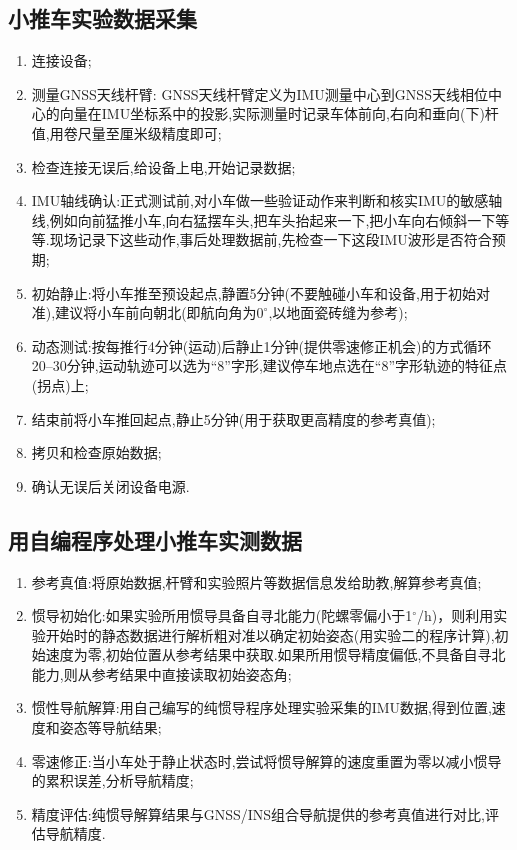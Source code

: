 \documentclass[10pt,a4paper]{ctexart}
\begin{document}
\subsection{小推车实验数据采集}\label{subsec:3.2}
\begin{enumerate}[nosep,label={(\arabic*)}]
\item 连接设备;
\item 测量GNSS天线杆臂: GNSS天线杆臂定义为IMU测量中心到GNSS天线相位中心的向量在IMU坐标系中的投影,实际测量时记录车体前向,右向和垂向(下)杆值,用卷尺量至厘米级精度即可;
\item 检查连接无误后,给设备上电,开始记录数据;
\item IMU轴线确认:正式测试前,对小车做一些验证动作来判断和核实IMU的敏感轴线,例如向前猛推小车,向右猛摆车头,把车头抬起来一下,把小车向右倾斜一下等等.现场记录下这些动作,事后处理数据前,先检查一下这段IMU波形是否符合预期;
\item 初始静止:将小车推至预设起点,静置5分钟(不要触碰小车和设备,用于初始对准),建议将小车前向朝北(即航向角为$0^\circ$,以地面瓷砖缝为参考);
\item 动态测试:按每推行4分钟(运动)后静止1分钟(提供零速修正机会)的方式循环20--30分钟,运动轨迹可以选为``8''字形,建议停车地点选在``8''字形轨迹的特征点(拐点)上;
\item 结束前将小车推回起点,静止5分钟(用于获取更高精度的参考真值);
\item 拷贝和检查原始数据;
\item 确认无误后关闭设备电源.
\end{enumerate}

\subsection{用自编程序处理小推车实测数据}
\begin{enumerate}[nosep,label={(\arabic*)}]
\item 参考真值:将原始数据,杆臂和实验照片等数据信息发给助教,解算参考真值;
\item 惯导初始化:如果实验所用惯导具备自寻北能力(陀螺零偏小于1${}^\circ$/h)，则利用实验开始时的静态数据进行解析粗对准以确定初始姿态(用实验二的程序计算),初始速度为零,初始位置从参考结果中获取.如果所用惯导精度偏低,不具备自寻北能力,则从参考结果中直接读取初始姿态角;
\item 惯性导航解算:用自己编写的纯惯导程序处理实验采集的IMU数据,得到位置,速度和姿态等导航结果;
\item 零速修正:当小车处于静止状态时,尝试将惯导解算的速度重置为零以减小惯导的累积误差,分析导航精度;
\item 精度评估:纯惯导解算结果与GNSS/INS组合导航提供的参考真值进行对比,评估导航精度.
\end{enumerate}
\end{document}
